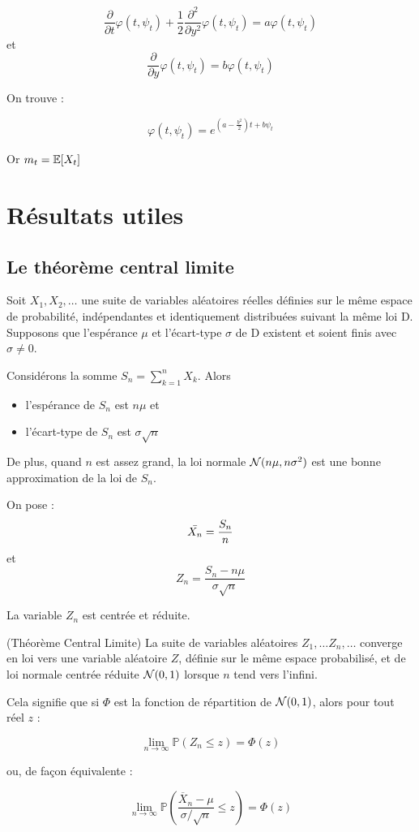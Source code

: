 \[ \dfrac{\partial }{\partial t}\varphi(t,\psi_t) + \dfrac{1}{2}\dfrac{\partial^2}{\partial y^2}\varphi(t,\psi_t) = a\varphi(t,\psi_t) \]
et 
\[\dfrac{\partial}{\partial y}\varphi(t,\psi_t) = b\varphi(t,\psi_t) \]

On trouve :

\[ \varphi(t,\psi_t) = e^{(a-\frac{b^2}{2})t + b\psi_t} \]


Or $m_t = \mathbb{E}[X_t]$
\chapter{Résultats utiles}

\section{Le théorème central limite}
Soit $X_1, X_2,\ldots$ une suite de variables aléatoires réelles définies sur le même espace de probabilité, indépendantes et identiquement distribuées suivant la même loi D. Supposons que l'espérance $\mu$ et l'écart-type $\sigma$ de D existent et soient finis avec $\sigma \neq 0$.

Considérons la somme $S_n = \sum_{k=1}^n X_k$. Alors 
\begin{itemize}
  \item l'espérance de $S_n$ est $n\mu$ et
  \item l'écart-type de $S_n$ est $\sigma\sqrt{n}$
\end{itemize}

De plus, quand $n$  est \og assez grand\fg{}, la loi normale $\mathcal{N}(n\mu, n\sigma^2)$ est une bonne approximation de la loi de $S_n$.

On pose : 
\[ \Bar{X_n} = \frac{S_n}{n} \]
et 
\[ Z_n = \frac{S_n - n\mu}{\sigma\sqrt{n}} \]

La variable $Z_n$ est centrée et réduite.

\begin{thm}(Théorème Central Limite)
La suite de variables aléatoires $Z_1, \ldots Z_n, \ldots$ converge en loi vers une variable aléatoire $Z$, définie sur le même espace probabilisé, et de loi normale centrée réduite $\mathcal{N}(0,1)$ lorsque $n$ tend vers l'infini.

Cela signifie que si $\Phi$ est la fonction de répartition de $\mathcal{N}(0,1)$, alors pour tout réel $z$ :

\[ \lim_{n \to \infty} \mathbb P(Z_n \le z) = \Phi(z) \]

ou, de façon équivalente :

\[ \lim_{n \to \infty}\mathbb P\left(\frac{\overline X_n - \mu}{\sigma/\sqrt n}\leq z\right) = \Phi(z)\]
\end{thm}

